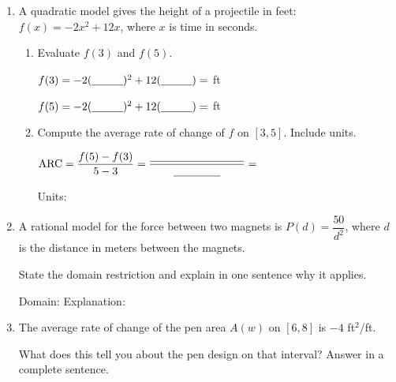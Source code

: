\documentclass[10pt]{article}
\begin{document}
\namedateperiod

\vspace{0.12in}

\begin{enumerate}[itemsep=18pt]

\item A quadratic model gives the height of a projectile in feet:
      $f(x) = -2x^2 + 12x$, where $x$ is time in seconds.

      \begin{enumerate}[label=(\alph*), itemsep=10pt]
        \item Evaluate $f(3)$ and $f(5)$.

              \vspace{0.06in}
              $f(3) = -2(\blank{1cm})^2 + 12(\blank{1cm}) = $ \blank{2.5cm} ft

              \vspace{0.06in}
              $f(5) = -2(\blank{1cm})^2 + 12(\blank{1cm}) = $ \blank{2.5cm} ft

        \item Compute the average rate of change of $f$ on $[3, 5]$. Include units.

              \vspace{0.06in}
              $\text{ARC} = \dfrac{f(5) - f(3)}{5 - 3} = \dfrac{\blank{3cm}}{\blank{1.5cm}} = $ \blank{3cm}

              \vspace{0.04in}
              Units: \blank{4cm}
      \end{enumerate}

\item A rational model for the force between two magnets is $P(d) = \dfrac{50}{d^2}$,
      where $d$ is the distance in meters between the magnets.

      State the domain restriction and explain in one sentence why it applies.

      \vspace{0.06in}
      Domain: \blank{3cm} \quad Explanation: \writeline

\item The average rate of change of the pen area $A(w)$ on $[6, 8]$ is $-4$ ft$^2$/ft.

      What does this tell you about the pen design on that interval? Answer in a complete sentence.

      \vspace{0.08in}

\end{enumerate}
\end{document}

